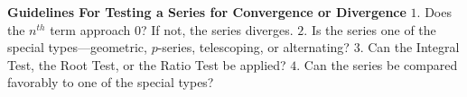 \nopagenumbers
{\bf Guidelines For Testing a Series for Convergence or Divergence}
\vskip 6pt
$1.$ Does the $n^{th}$ term approach $0$? If not, the series diverges.
\vskip 1mm
$2.$ Is the series one of the special types---geometric, $p$-series, telescoping, or alternating?
\vskip 1mm
$3.$ Can the Integral Test, the Root Test, or the Ratio Test be applied?
\vskip 1mm
$4.$ Can the series be compared favorably to one of the special types?
\vfill\eject
